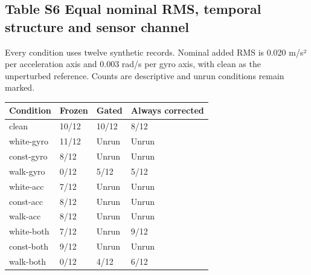 \documentclass[10pt,letterpaper]{article}
\begin{document}
\begin{minipage}{\linewidth}\subsection*{Table S6 Equal nominal RMS, temporal structure and sensor channel}


Every condition uses twelve synthetic records. Nominal added RMS is
0.020 m/s² per acceleration axis and 0.003 rad/s per gyro axis, with
clean as the unperturbed reference. Counts are descriptive and unrun
conditions remain marked.



\begin{center}\small\begin{tabular}{@{}p{}p{}p{}p{}@{}}\toprule
\textbf{Condition} & \textbf{Frozen} & \textbf{Gated} & \textbf{Always corrected} \\ \midrule
clean & 10/12 & 10/12 & 8/12 \\
white-gyro & 11/12 & Unrun & Unrun \\
const-gyro & 8/12 & Unrun & Unrun \\
walk-gyro & 0/12 & 5/12 & 5/12 \\
white-acc & 7/12 & Unrun & Unrun \\
const-acc & 8/12 & Unrun & Unrun \\
walk-acc & 8/12 & Unrun & Unrun \\
white-both & 7/12 & Unrun & 9/12 \\
const-both & 9/12 & Unrun & Unrun \\
walk-both & 0/12 & 4/12 & 6/12 \\
\bottomrule\end{tabular}\end{center}
\end{minipage}\par\medskip
\end{document}
